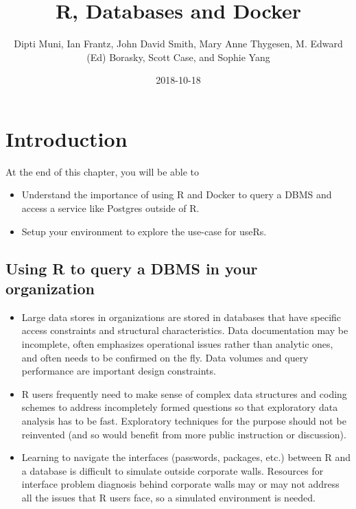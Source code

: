 \documentclass[]{book}
\title{R, Databases and Docker}
\author{Dipti Muni, Ian Frantz, John David Smith, Mary Anne Thygesen, M. Edward
(Ed) Borasky, Scott Case, and Sophie Yang}
\date{2018-10-18}
\providecommand{\tightlist}{%
  \setlength{\itemsep}{0pt}\setlength{\parskip}{0pt}}
\theoremstyle{definition}
\theoremstyle{definition}
\theoremstyle{definition}
\theoremstyle{remark}
\begin{document}
\maketitle

{
\setcounter{tocdepth}{1}
\tableofcontents
}
\hypertarget{introduction}{%
\chapter{Introduction}\label{introduction}}

At the end of this chapter, you will be able to

\begin{itemize}
\tightlist
\item
  Understand the importance of using R and Docker to query a DBMS and
  access a service like Postgres outside of R.
\item
  Setup your environment to explore the use-case for useRs.
\end{itemize}

\hypertarget{using-r-to-query-a-dbms-in-your-organization}{%
\section{Using R to query a DBMS in your
organization}\label{using-r-to-query-a-dbms-in-your-organization}}

\begin{itemize}
\tightlist
\item
  Large data stores in organizations are stored in databases that have
  specific access constraints and structural characteristics. Data
  documentation may be incomplete, often emphasizes operational issues
  rather than analytic ones, and often needs to be confirmed on the fly.
  Data volumes and query performance are important design constraints.
\item
  R users frequently need to make sense of complex data structures and
  coding schemes to address incompletely formed questions so that
  exploratory data analysis has to be fast. Exploratory techniques for
  the purpose should not be reinvented (and so would benefit from more
  public instruction or discussion).
\item
  Learning to navigate the interfaces (passwords, packages, etc.)
  between R and a database is difficult to simulate outside corporate
  walls. Resources for interface problem diagnosis behind corporate
  walls may or may not address all the issues that R users face, so a
  simulated environment is needed.
\end{itemize}
\end{document}
